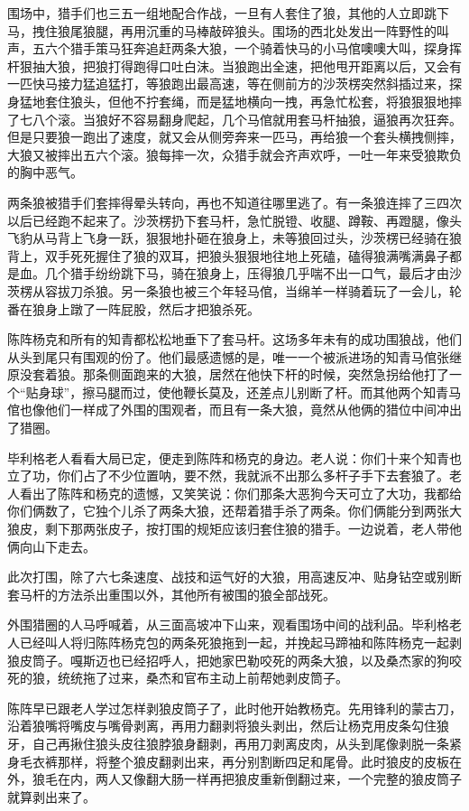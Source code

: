 \par 围场中，猎手们也三五一组地配合作战，一旦有人套住了狼，其他的人立即跳下马，拽住狼尾狼腿，再用沉重的马棒敲碎狼头。围场的西北处发出一阵野性的叫声，五六个猎手策马狂奔追赶两条大狼，一个骑着快马的小马倌噢噢大叫，探身挥杆狠抽大狼，把狼打得跑得口吐白沫。当狼跑出全速，把他甩开距离以后，又会有一匹快马接力猛追猛打，等狼跑出最高速，等在侧前方的沙茨楞突然斜插过来，探身猛地套住狼头，但他不拧套绳，而是猛地横向一拽，再急忙松套，将狼狠狠地摔了七八个滚。当狼好不容易翻身爬起，几个马倌就用套马杆抽狼，逼狼再次狂奔。但是只要狼一跑出了速度，就又会从侧旁奔来一匹马，再给狼一个套头横拽侧摔，大狼又被摔出五六个滚。狼每摔一次，众猎手就会齐声欢呼，一吐一年来受狼欺负的胸中恶气。
\par 两条狼被猎手们套摔得晕头转向，再也不知道往哪里逃了。有一条狼连摔了三四次以后已经跑不起来了。沙茨楞扔下套马杆，急忙脱镫、收腿、蹲鞍、再蹬腿，像头飞豹从马背上飞身一跃，狠狠地扑砸在狼身上，未等狼回过头，沙茨楞已经骑在狼背上，双手死死握住了狼的双耳，把狼头狠狠地往地上死磕，磕得狼满嘴满鼻子都是血。几个猎手纷纷跳下马，骑在狼身上，压得狼几乎喘不出一口气，最后才由沙茨楞从容拔刀杀狼。另一条狼也被三个年轻马倌，当绵羊一样骑着玩了一会儿，轮番在狼身上蹾了一阵屁股，然后才把狼杀死。
\par 陈阵杨克和所有的知青都松松地垂下了套马杆。这场多年未有的成功围狼战，他们从头到尾只有围观的份了。他们最感遗憾的是，唯一一个被派进场的知青马倌张继原没套着狼。那条侧面跑来的大狼，居然在他快下杆的时候，突然急拐给他打了一个“贴身球”，擦马腿而过，使他鞭长莫及，还差点儿别断了杆。而其他两个知青马倌也像他们一样成了外围的围观者，而且有一条大狼，竟然从他俩的猎位中间冲出了猎圈。
\par 毕利格老人看看大局已定，便走到陈阵和杨克的身边。老人说：你们十来个知青也立了功，你们占了不少位置呐，要不然，我就派不出那么多杆子手下去套狼了。老人看出了陈阵和杨克的遗憾，又笑笑说：你们那条大恶狗今天可立了大功，我都给你们俩数了，它独个儿杀了两条大狼，还帮着猎手杀了两条。你们俩能分到两张大狼皮，剩下那两张皮子，按打围的规矩应该归套住狼的猎手。一边说着，老人带他俩向山下走去。
\par 此次打围，除了六七条速度、战技和运气好的大狼，用高速反冲、贴身钻空或别断套马杆的方法杀出重围以外，其他所有被围的狼全部战死。
\par 外围猎圈的人马呼喊着，从三面高坡冲下山来，观看围场中间的战利品。毕利格老人已经叫人将归陈阵杨克包的两条死狼拖到一起，并挽起马蹄袖和陈阵杨克一起剥狼皮筒子。嘎斯迈也已经招呼人，把她家巴勒咬死的两条大狼，以及桑杰家的狗咬死的狼，统统拖了过来，桑杰和官布主动上前帮她剥皮筒子。
\par 陈阵早已跟老人学过怎样剥狼皮筒子了，此时他开始教杨克。先用锋利的蒙古刀，沿着狼嘴将嘴皮与嘴骨剥离，再用力翻剥将狼头剥出，然后让杨克用皮条勾住狼牙，自己再揪住狼头皮往狼脖狼身翻剥，再用刀剥离皮肉，从头到尾像剥脱一条紧身毛衣裤那样，将整个狼皮翻剥出来，再分别割断四足和尾骨。此时狼皮的皮板在外，狼毛在内，两人又像翻大肠一样再把狼皮重新倒翻过来，一个完整的狼皮筒子就算剥出来了。
